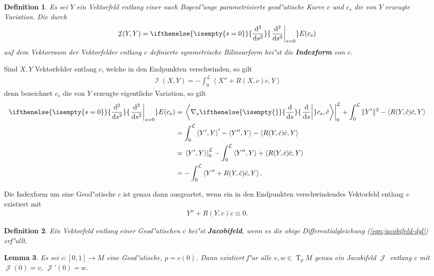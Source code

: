 \documentclass[paper=A4, twoside, chapterprefix=true, bibliography=totoc, headsepline]{scrbook}
\DeclareMathOperator{\calI}{\mathcal{I}}
\DeclareMathOperator{\calJ}{\mathcal{J}}
\DeclareMathOperator{\T}{T}         %
\newcommand{\dop}{\mathrm{d}}
\newcommand{\difffrac}[3][]{\ifthenelse{\isempty{#1}}{\frac{\dop #2}{\dop #3}}{\left. \frac{\dop #2}{\dop #3} \right|_{#1}}}
\theoremstyle{plain}
\newtheorem{Dfn}{Definition}[chapter]
\newtheorem{Lemma}[Dfn]{Lemma}
\theoremstyle{nonumberplain}
\theoremstyle{empty}
\theoremstyle{break}
\newcommand{\CmIndex}[2][]{\ifthenelse{\isempty{#1}}{\index{#2}}{\index{#1}}#2}
\newcommand{\CmMark}[2][]{\textbf{\CmIndex[#1]{#2}}}
\begin{document}
\begin{Dfn}
  Es sei $Y$ ein Vektorfeld entlang einer nach Bogenl"ange parametrisierte geod"atische Kurve $c$ und $c_s$ die von $Y$ erzeugte Variation. Die durch
  \begin{align*}
    \calI(Y,Y) = \difffrac[s=0]{^2}{s^2} E(c_s)
  \end{align*}
  auf dem Vektorraum der Vektorfelder entlang $c$ definierte symmetrische Bilinearform hei"st die \CmMark{Indexform} von $c$.
\end{Dfn}

Sind $X,Y$ Vektorfelder entlang $c$, welche in den Endpunkten
verschwinden, so gilt
\begin{align*}
  \calI(X,Y) = -\int_0^{\mathcal L}\left<X'' + R(X,\dot c)\dot
    c,Y\right>
\end{align*}
denn bezeichnet $c_s$ die von $Y$ erzeugte eigentliche Variation, so
gilt
\begin{align*}
  \difffrac[s=0]{^2}{s^2}E(c_s) & = \left.\left<\nabla_s\difffrac{}{s}c_s,\dot c\right>\right|_0^{\mathcal L} + \int_0^{\mathcal L}\|Y'\|^2 - \left<R(Y,\dot c)\dot c,Y\right>\\
  & = \int_0^{\mathcal L}\left<Y',Y\right>' - \left<Y'',Y\right> - \left<R(Y,\dot c)\dot c,Y\right>\\
  & = \left.\left<Y',Y\right>\right|_0^{\mathcal L} - \int_0^{\mathcal L} \left<Y'',Y\right> + \left<R(Y,\dot c)\dot c,Y\right>\\
  & = - \int_0^{\mathcal L}\left<Y'' + R(Y,\dot c) \dot c, Y\right>.
\end{align*}

Die Indexform um eine Geod"atische $c$ ist genau dann ausgeartet, wenn ein in den Endpunkten verschwindendes Vektorfeld entlang $c$ existiert mit
\begin{align}
  Y'' + R(Y,\dot c) \dot c \equiv 0.\label{eqn:jacobifeld-dgl}
\end{align}

\begin{Dfn}
  Ein Vektorfeld entlang einer Geod"atischen $c$ hei"st \CmMark{Jacobifeld}, wenn es die obige Differentialgleichung (\ref{eqn:jacobifeld-dgl}) erf"ullt.
\end{Dfn}

\begin{Lemma}\label{thm:lemma-9-4}
  Es sei $c \colon [0,1] \to M$ eine Geod"atische, $p = c(0)$.
  Dann existiert f"ur alle $v,w \in \T_pM$ genau ein Jacobifeld $\calJ$ entlang $c$ mit $\calJ(0) = v, \ \calJ'(0) = w$.
\end{Lemma}
\end{document}
